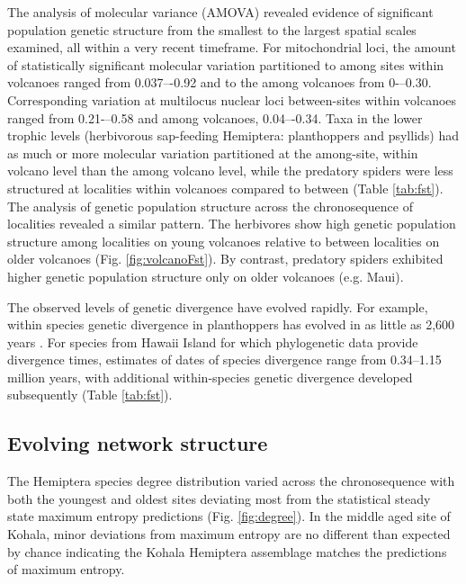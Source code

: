 \documentclass[12pt]{article}
\begin{document}
\begin{linenumbers}
The analysis of molecular variance (AMOVA) revealed evidence of
significant population genetic structure from the smallest to the
largest spatial scales examined, all within a very recent
timeframe. For mitochondrial loci, the amount of statistically
significant molecular variation partitioned to among sites within
volcanoes ranged from 0.037–-0.92 and to the among volcanoes from
0-–0.30. Corresponding variation at multilocus nuclear loci
between-sites within volcanoes ranged from 0.21-–0.58 and among
volcanoes, 0.04–-0.34. Taxa in the lower trophic levels (herbivorous
sap-feeding Hemiptera: planthoppers and psyllids) had as much or more
molecular variation partitioned at the among-site, within volcano
level than the among volcano level, while the predatory spiders were
less structured at localities within volcanoes compared to between
(Table \ref{tab:fst}). The analysis of genetic population structure
across the chronosequence of localities revealed a similar
pattern. The herbivores show high genetic population structure among
localities on young volcanoes relative to between localities on older
volcanoes (Fig. \ref{fig:volcanoFst}). By contrast, predatory spiders
exhibited higher genetic population structure only on older volcanoes
(e.g. Maui).

The observed levels of genetic divergence have evolved rapidly. For
example, within species genetic divergence in planthoppers has evolved
in as little as 2,600 years \citep{goodman2012}. For species from
Hawaii Island for which phylogenetic data provide divergence times,
estimates of dates of species divergence range from 0.34–1.15 million
years, with additional within-species genetic divergence developed
subsequently (Table \ref{tab:fst}).

\subsection*{Evolving network structure}

The Hemiptera species degree distribution varied across the
chronosequence with both the youngest and oldest sites deviating most
from the statistical steady state maximum entropy predictions
(Fig. \ref{fig:degree}). In the middle aged site of Kohala, minor
deviations from maximum entropy are no different than expected by
chance indicating the Kohala Hemiptera assemblage matches the
predictions of maximum entropy.


\end{linenumbers}
\end{document}
